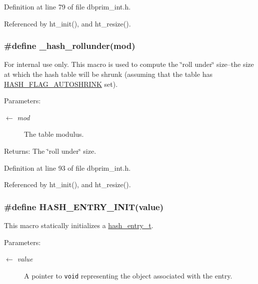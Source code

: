 Definition at line 79 of file dbprim\_\-int.h.

Referenced by ht\_\-init(), and ht\_\-resize().\hypertarget{group__dbprim__hash_ga47}{
\subsubsection[\_\-hash\_\-rollunder]{\setlength{\rightskip}{0pt plus 5cm}\#define \_\-hash\_\-rollunder(mod)}}
\label{group__dbprim__hash_ga47}


\begin{Desc}
\item[For internal use only.]
This macro is used to compute the \char`\"{}roll under\char`\"{} size--the size at which the hash table will be shrunk (assuming that the table has \hyperlink{group__dbprim__hash_ga23}{HASH\_\-FLAG\_\-AUTOSHRINK} set).

\begin{Desc}
\item[Parameters:]
\begin{description}
\item[\mbox{$\leftarrow$} {\em mod}]The table modulus.\end{description}
\end{Desc}
\begin{Desc}
\item[Returns:]The \char`\"{}roll under\char`\"{} size.\end{Desc}
\end{Desc}


Definition at line 93 of file dbprim\_\-int.h.

Referenced by ht\_\-init(), and ht\_\-resize().\hypertarget{group__dbprim__hash_ga37}{
\subsubsection[HASH\_\-ENTRY\_\-INIT]{\setlength{\rightskip}{0pt plus 5cm}\#define HASH\_\-ENTRY\_\-INIT(value)}}
\label{group__dbprim__hash_ga37}


This macro statically initializes a \hyperlink{group__dbprim__hash_ga2}{hash\_\-entry\_\-t}.

\begin{Desc}
\item[Parameters:]
\begin{description}
\item[\mbox{$\leftarrow$} {\em value}]A pointer to {\tt void} representing the object associated with the entry.\end{description}
\end{Desc}


